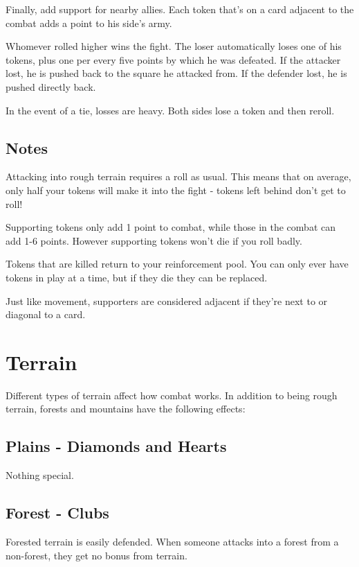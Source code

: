 \documentclass{article}
\begin{document}
Finally, add support for nearby allies.  Each token that's on a card adjacent to the combat adds a point to his side's army.  

Whomever rolled higher wins the fight.  The loser automatically loses one of his tokens, plus one per every five points by which he was defeated.  If the attacker lost, he is pushed back to the square he attacked from.  If the defender lost, he is pushed directly back. 

In the event of a tie, losses are heavy.  Both sides lose a token and then reroll.

\subsection{Notes}

Attacking into rough terrain requires a roll as usual.  This means that on average, only half your tokens will make it into the fight - tokens left behind don't get to roll!

Supporting tokens only add 1 point to combat, while those in the combat can add 1-6 points.  However supporting tokens won't die if you roll badly.

Tokens that are killed return to your reinforcement pool.  You can only ever have \reinforcements tokens in play at a time, but if they die they can be replaced.

Just like movement, supporters are considered adjacent if they're next to or diagonal to a card.  

\section{Terrain}

Different types of terrain affect how combat works.  In addition to being rough terrain, forests and mountains have the following effects:

\subsection{Plains - Diamonds and Hearts}

Nothing special.

\subsection{Forest - Clubs}

Forested terrain is easily defended.  When someone attacks into a forest from a non-forest, they get no bonus from terrain.  
\end{document}
